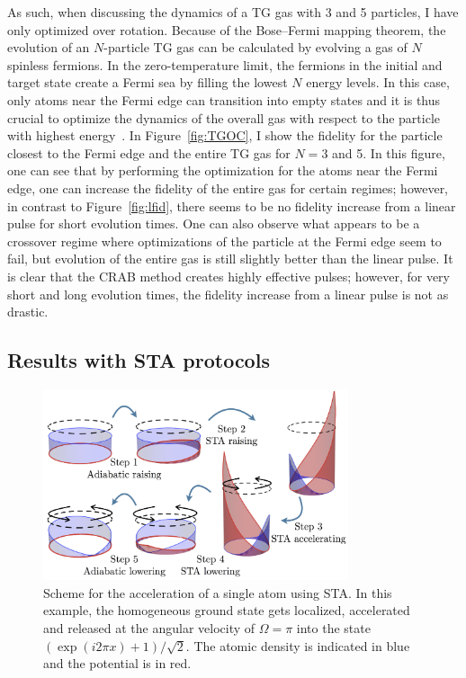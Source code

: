 As such, when discussing the dynamics of a TG gas with 3 and 5 particles, I have only optimized over rotation.
Because of the Bose--Fermi mapping theorem, the evolution of an $N$-particle TG gas can be calculated by evolving a gas of $N$ spinless fermions.
In the zero-temperature limit, the fermions in the initial and target state create a Fermi sea by filling the lowest $N$ energy levels.
In this case, only atoms near the Fermi edge can transition into empty states and it is thus crucial to optimize the dynamics of the overall gas with respect to the particle with highest energy~\cite{garaot2015}.
In Figure~\ref{fig:TGOC}, I show the fidelity for the particle closest to the Fermi edge and the entire TG gas for $N=3$ and 5.
In this figure, one can see that by performing the optimization for the atoms near the Fermi edge, one can increase the fidelity of the entire gas for certain regimes; however, in contrast to Figure~\ref{fig:lfid}, there seems to be no fidelity increase from a linear pulse for short evolution times.
One can also observe what appears to be a crossover regime where optimizations of the particle at the Fermi edge seem to fail, but evolution of the entire gas is still slightly better than the linear pulse.
It is clear that the CRAB method creates highly effective pulses; however, for very short and long evolution times, the fidelity increase from a linear pulse is not as drastic.

\subsection{Results with STA protocols}

\begin{figure}
\centering
\includegraphics[width=0.8\textwidth]{data/1d/STAscheme.png} 
\caption{Scheme for the acceleration of a single atom using STA.
 In this example, the homogeneous ground state gets localized, accelerated and released at the angular velocity of $\Omega=\pi$ into the state
 $\left( \exp(i 2\pi x) +1 \right) /\sqrt 2$.
 The atomic density is indicated in blue and the potential is in red.}
\label{fig:STA-scheme}
\end{figure}



